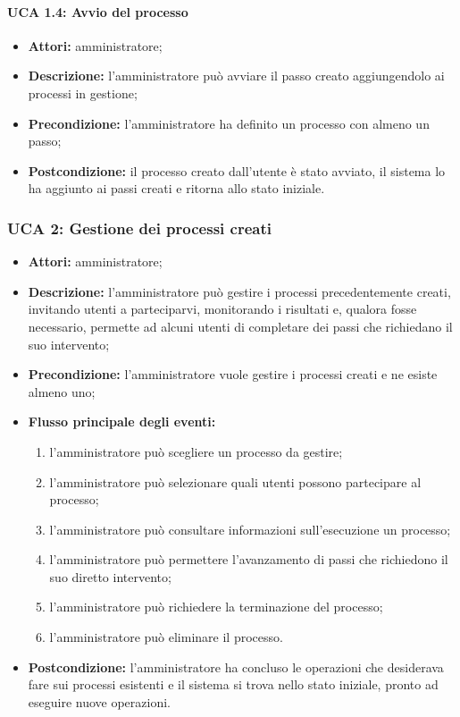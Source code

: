 \paragraph{UCA 1.4: Avvio del processo}
\begin{itemize}
\item \textbf{Attori:} 
amministratore;
\item \textbf{Descrizione:} 
l'amministratore può avviare il passo creato aggiungendolo ai processi in gestione; 
\item \textbf{Precondizione:} 
l'amministratore ha definito un processo con almeno un passo;
\item \textbf{Postcondizione:} 
il processo creato dall'utente è stato avviato, il sistema lo ha aggiunto ai passi creati e ritorna allo stato iniziale.
\end{itemize}

\subsubsection{UCA 2: Gestione dei processi creati}
\begin{itemize}
\item \textbf{Attori:} 
amministratore;
\item \textbf{Descrizione:} 
l'amministratore può gestire i processi precedentemente creati, invitando utenti a parteciparvi, monitorando i risultati e, qualora fosse necessario, permette ad alcuni utenti di completare dei passi che richiedano il suo intervento;
\item \textbf{Precondizione:} 
l'amministratore vuole gestire i processi creati e ne esiste almeno uno;
\item \textbf{Flusso principale degli eventi:} 
\begin{enumerate}
\item l'amministratore può scegliere un processo da gestire;
\item l'amministratore può selezionare quali utenti possono partecipare al processo;
\item l'amministratore può consultare informazioni sull'esecuzione un processo;
\item l'amministratore può permettere l'avanzamento di passi che richiedono il suo diretto intervento;
\item l'amministratore può richiedere la terminazione del processo;
\item l'amministratore può eliminare il processo.
\end{enumerate}
\item \textbf{Postcondizione:} 
l'amministratore ha concluso le operazioni che desiderava fare sui processi esistenti e il sistema si trova nello stato iniziale, pronto ad eseguire nuove operazioni.
\end{itemize}

